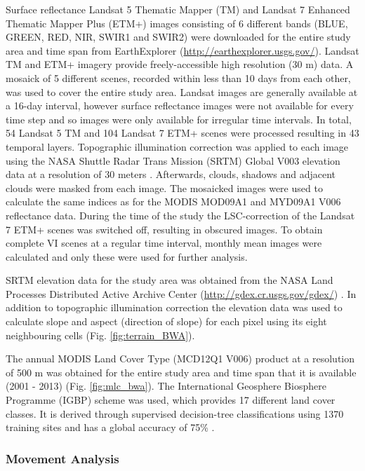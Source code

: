 \documentclass[12pt,a4paper, twoside, english]{article}
\begin{document}
Surface reflectance Landsat 5 Thematic Mapper (TM) and Landsat 7 Enhanced Thematic Mapper Plus (ETM+) images consisting of 6 different bands (BLUE, GREEN, RED, NIR, SWIR1 and SWIR2) were downloaded for the entire study area and time span from EarthExplorer (\url{http://earthexplorer.usgs.gov/}). Landsat TM and ETM+ imagery provide freely-accessible high resolution (30 m) data. A mosaick of 5 different scenes, recorded within less than 10 days from each other, was used to cover the entire study area. Landsat images are generally available at a 16-day interval, however surface reflectance images were not available for every time step and so images were only available for irregular time intervals. In total, 54 Landsat 5 TM and 104 Landsat 7 ETM+ scenes were processed resulting in 43 temporal layers. Topographic illumination correction was applied to each image using the NASA Shuttle Radar Trans Mission (SRTM) Global V003 elevation data at a resolution of 30 meters \citep{NASAJPL2013}. Afterwards, clouds, shadows and adjacent clouds were masked from each image. The mosaicked images were used to calculate the same indices as for the MODIS MOD09A1 and MYD09A1 V006 reflectance data. During the time of the study the LSC-correction of the Landsat 7 ETM+ scenes was switched off, resulting in obscured images. To obtain complete VI scenes at a regular time interval, monthly mean images were calculated and only these were used for further analysis.

SRTM elevation data for the study area was obtained from the NASA Land Processes Distributed Active Archive Center (\url{http://gdex.cr.usgs.gov/gdex/}) \citep{NASAJPL2013}. In addition to topographic illumination correction the elevation data was used to calculate slope and aspect (direction of slope) for each pixel using its eight neighbouring cells \citep{Horn1981} (Fig. \ref{fig:terrain_BWA}).

The annual MODIS Land Cover Type (MCD12Q1 V006) product at a resolution of 500 m was obtained for the entire study area and time span that it is available (2001 - 2013) (Fig. \ref{fig:mlc_bwa}). The International Geosphere Biosphere Programme (IGBP) scheme was used, which provides 17 different land cover classes. It is derived through supervised decision-tree classifications using 1370 training sites and has a global accuracy of 75\% \citep{Cohen2006}.

\subsubsection{Movement Analysis}
\end{document}
